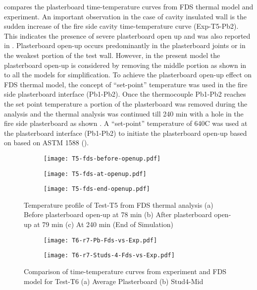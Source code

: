  compares the plasterboard time-temperature curves from FDS thermal model and experiment. An important observation in the case of cavity insulated wall is the sudden increase of the fire side cavity time-temperature curve (Exp-T5-Pb2). This indicates the presence of severe plasterboard open up and was also reported in . Plasterboard open-up occurs predominantly in the plasterboard joints or in the weakest portion of the test wall. However, in the present model the plasterboard open-up is considered by removing the middle portion as shown in  to all the models for simplification. To achieve the plasterboard open-up effect on FDS thermal model, the concept of ``set-point'' temperature was used in the fire side plasterboard interface (Pb1-Pb2). Once the thermocouple Pb1-Pb2 reaches the set point temperature a portion of the plasterboard was removed during the analysis and the thermal analysis was continued till 240 min with a hole in the fire side plasterboard as shown . A ``set-point'' temperature of 640\degree C was used at the plasterboard interface (Pb1-Pb2) to initiate the plasterboard open-up based on based on ASTM 1588 (\citet{Sultan2015}). 
\begin{figure}[!htbp]
	\centering
	\begin{subfigure}[b]{0.45\textwidth}
		\centering
		\texttt{[image: T5-fds-before-openup.pdf]}
		\caption{}
		\label{subfig:T5-fds-before-openup}
	\end{subfigure}
	\begin{subfigure}[b]{0.45\textwidth}
		\centering
		\texttt{[image: T5-fds-at-openup.pdf]}
		\caption{}
		\label{subfig:T5-fds-at-openup}
	\end{subfigure}
	\begin{subfigure}[b]{0.45\textwidth}
		\centering
		\texttt{[image: T5-fds-end-openup.pdf]}
		\caption{}
		\label{subfig:T5-fds-end-openup}
	\end{subfigure}
	   \caption{Temperature profile of Test-T5 from FDS thermal analysis (a) Before plasterboard open-up at 78 min (b) After plasterboard open-up at 79 min (c) At 240 min (End of Simulation)}
	   \label{fig:T5-fds-output}
\end{figure}
\begin{figure}[!htbp]
	\centering
	\begin{subfigure}[b]{0.7\textwidth}
		\centering
		\texttt{[image: T6-r7-Pb-Fds-vs-Exp.pdf]}
		\caption{}
		\label{subfig:T6-r7-Pb-Fds-vs-Exp}
	\end{subfigure}
	\begin{subfigure}[b]{0.6\textwidth}
		\centering
		\texttt{[image: T6-r7-Studs-4-Fds-vs-Exp.pdf]}
		\caption{}
		\label{subfig:T6-r7-Studs-4-Fds-vs-Exp}
	\end{subfigure}
	   \caption{Comparison of time-temperature curves from experiment and FDS model for Test-T6 (a) Average Plasterboard (b) Stud4-Mid}
	   \label{fig:fds-output-pb-studs-t6}
\end{figure}

